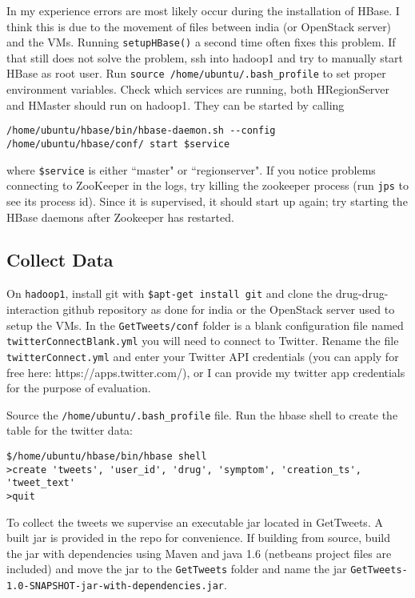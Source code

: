 \documentclass[letterpaper]{article}
\begin{document}
In my experience errors are most likely occur during the installation of HBase. I think this is due to the movement of files between india (or OpenStack server) and the VMs. Running \lstinline|setupHBase()| a second time often fixes this problem. If that still does not solve the problem, ssh into hadoop1 and try to manually start HBase as root user. Run \lstinline|source /home/ubuntu/.bash_profile| to set proper environment variables. Check which services are running, both HRegionServer and HMaster should run on hadoop1. They can be started by calling
\begin{lstlisting}
/home/ubuntu/hbase/bin/hbase-daemon.sh --config /home/ubuntu/hbase/conf/ start $service
\end{lstlisting}
where \lstinline|$service| is either ``master" or ``regionserver". If you notice problems connecting to ZooKeeper in the logs, try killing the zookeeper process (run \lstinline|jps| to see its process id). Since it is supervised, it should start up again; try starting the HBase daemons after Zookeeper has restarted.

\subsection{Collect Data}


On \lstinline|hadoop1|, install git with \lstinline|$apt-get install git| and clone the drug-drug-interaction github repository as done for india or the OpenStack server used to setup the VMs. In the \lstinline|GetTweets/conf| folder is a blank configuration file named \lstinline|twitterConnectBlank.yml| you will need to connect to Twitter. Rename the file \lstinline|twitterConnect.yml| and enter your Twitter API credentials (you can apply for free here: https://apps.twitter.com/), or I can provide my twitter app credentials for the purpose of evaluation.

Source the \lstinline|/home/ubuntu/.bash_profile| file. Run the hbase shell to create the table for the twitter data:
\begin{lstlisting}
$/home/ubuntu/hbase/bin/hbase shell
>create 'tweets', 'user_id', 'drug', 'symptom', 'creation_ts', 'tweet_text'
>quit
\end{lstlisting}

To collect the tweets we supervise an executable jar located in GetTweets. A built jar is provided in the repo for convenience. If building from source, build the jar with dependencies using Maven and java 1.6 (netbeans project files are included) and move the jar to the \lstinline|GetTweets| folder and name the jar \lstinline|GetTweets-1.0-SNAPSHOT-jar-with-dependencies.jar|.
\end{document}
